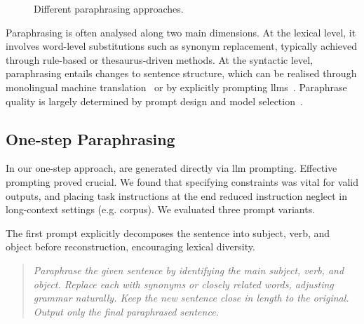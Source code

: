 \begin{figure}[h]
    \centering
    
    \caption{Different paraphrasing approaches.}
    \label{fig:paraphrasing_approaches}
\end{figure}


Paraphrasing is often analysed along two main dimensions. 
At the lexical level, it involves word-level substitutions such as synonym replacement, typically achieved through rule-based or thesaurus-driven methods. 
At the syntactic level, paraphrasing entails changes to sentence structure, which can be realised through monolingual machine translation~\citep{zhou_paraphrase_2021} or by explicitly prompting \acp{llm}~\citep{kurt_pehlivanoglu_comparative_2024}.
Paraphrase quality is largely determined by prompt design and model selection~\citep{Wu_ODD_challenges_2025}.


\subsection{One-step Paraphrasing}

In our one-step approach, \imps{} are generated directly via \ac{llm} prompting. 
Effective prompting proved crucial. 
We found that specifying constraints was vital for valid outputs, and placing task instructions at the end reduced instruction neglect in long-context settings (e.g. \dataGutenberg{} corpus). 
We evaluated three prompt variants.
%     

The first prompt explicitly decomposes the sentence into subject, verb, and object before reconstruction, encouraging lexical diversity. 
\begin{quote}
    \textit{Paraphrase the given sentence by identifying the main subject, verb, and object. Replace each with synonyms or closely related words, adjusting grammar naturally. Keep the new sentence close in length to the original. Output only the final paraphrased sentence.}
\end{quote}

